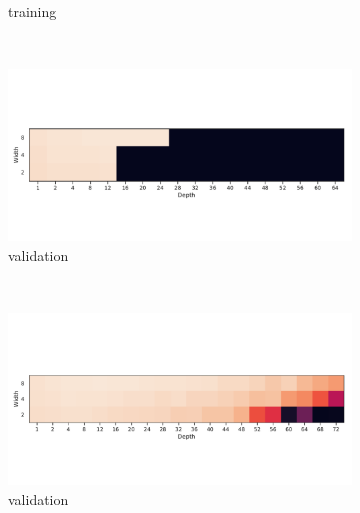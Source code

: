 \begin{figure}
\begin{subfigure}[b]{0.3\textwidth}
        \caption{\SepUnitPoint training}
        \label{fig:mnist_grid_up}
    \end{subfigure}
    ~ %
      \\
      \begin{subfigure}[b]{0.3\textwidth}
        \includegraphics[width=\textwidth]{img/mnist_grid/val-acc-relu-ks-3x3-bs-1024.pdf}
        \caption{\ReLU validation}
        \label{fig:mnist_grid_relu}
    \end{subfigure}
    ~ %
    \centering
    \begin{subfigure}[b]{0.3\textwidth}
        \includegraphics[width=\textwidth]{img/mnist_grid/val-acc-relu-bn-ks-3x3-bs-1024.pdf}
        \caption{\ReLUBN validation}
        \label{fig:mnist_grid_relubn}
    \end{subfigure}
    ~ %
    \centering
    \begin{subfigure}[b]{0.3\textwidth}

\end{subfigure}
\end{figure}
